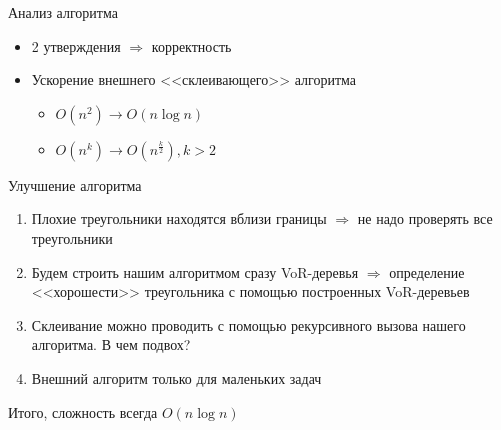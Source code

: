 \documentclass[14pt, fleqn, xcolor={dvipsnames, table}]{beamer}
\begin{document}
        \begin{frame}{Анализ алгоритма}
            \begin{itemize}
                \item 2 утверждения $\Longrightarrow$ корректность
                \item Ускорение внешнего <<склеивающего>> алгоритма
                \begin{itemize}
                    \item $O(n^2) \longrightarrow O(n \log n)$
                    \item $O(n^k) \longrightarrow O(n^\frac{k}{2}), k > 2$
                \end{itemize}
            \end{itemize}
            
        \end{frame}
        
        \begin{frame}{Улучшение алгоритма}
            \begin{enumerate}
                \item Плохие треугольники находятся вблизи границы $\Longrightarrow$ не надо проверять все треугольники
                \item Будем строить нашим алгоритмом сразу VoR-деревья  $\Longrightarrow$ определение <<хорошести>> треугольника с помощью построенных VoR-деревьев
                \item Склеивание можно проводить с помощью рекурсивного вызова нашего алгоритма. В чем подвох?
                \item Внешний алгоритм только для маленьких задач  
            \end{enumerate}
            Итого, сложность всегда $O(n \log n)$
        \end{frame}
        
\end{document}
